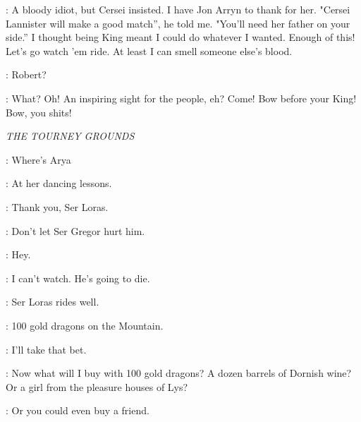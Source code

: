 \ROBERT: A bloody idiot, but Cersei insisted. I have Jon Arryn to thank for her. "Cersei Lannister will make a good match'', he told me. "You'll need her father on your side.'' I thought being King meant I could do whatever I wanted. Enough of this! Let's go watch 'em ride. At least I can smell someone else's blood.  


\NED: Robert? 

\ROBERT: What?  Oh! An inspiring sight for the people, eh? Come! Bow before your King! Bow, you shits! 


\scene

\textit{THE TOURNEY GROUNDS} 


\NED: Where's Arya 

\SANSA: At her dancing lessons.  


\SANSA: Thank you, Ser Loras. 


\SANSA:  Don't let Ser Gregor hurt him. 

\NED: Hey. 

\SANSA: I can't watch. He's going to die. 

\NED: Ser Loras rides well. 

\LITTLEFINGER:  100 gold dragons on the Mountain. 

\RENLY: I'll take that bet. 

\LITTLEFINGER: Now what will I buy with 100 gold dragons? A dozen barrels of Dornish wine? Or a girl from the pleasure houses of Lys? 

\RENLY: Or you could even buy a friend. 


